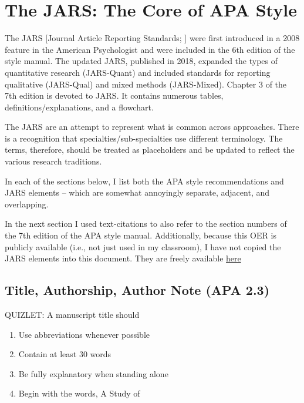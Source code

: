 \documentclass[
  english,
]{book}
\providecommand{\tightlist}{%
  \setlength{\itemsep}{0pt}\setlength{\parskip}{0pt}}
\begin{document}
\hypertarget{the-jars-the-core-of-apa-style}{%
\section{The JARS: The Core of APA Style}\label{the-jars-the-core-of-apa-style}}

The JARS {[}Journal Article Reporting Standards; \citet{appelbaum_journal_2018}{]} were first introduced in a 2008 feature in the American Psychologist \citep{noauthor_reporting_2008} and were included in the 6th edition of the style manual. The updated JARS, published in 2018, expanded the types of quantitative research (JARS-Quant) and included standards for reporting qualitative (JARS-Qual) and mixed methods (JARS-Mixed). Chapter 3 of the 7th edition is devoted to JARS. It contains numerous tables, definitions/explanations, and a flowchart.

The JARS are an attempt to represent what is common across approaches. There is a recognition that specialties/sub-specialties use different terminology. The terms, therefore, should be treated as placeholders and be updated to reflect the various research traditions.

In each of the sections below, I list both the APA style recommendations and JARS elements -- which are somewhat annoyingly separate, adjacent, and overlapping.

In the next section I used text-citations to also refer to the section numbers of the 7th edition of the APA style manual. Additionally, because this OER is publicly available (i.e., not just used in my classroom), I have not copied the JARS elements into this document. They are freely available \href{https://apastyle.apa.org/jars/quantitative}{here}

\hypertarget{title-authorship-author-note-apa-2.3}{%
\subsection{Title, Authorship, Author Note (APA 2.3)}\label{title-authorship-author-note-apa-2.3}}

QUIZLET:
A manuscript title should

\begin{enumerate}
\def\labelenumi{\alph{enumi}.}
\tightlist
\item
  Use abbreviations whenever possible
\item
  Contain at least 30 words
\item
  Be fully explanatory when standing alone
\item
  Begin with the words, A Study of
\end{enumerate}
\end{document}
